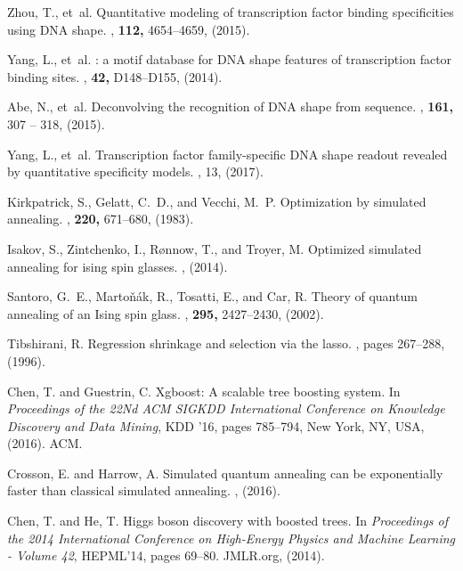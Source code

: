 \documentclass[aps,pra,groupedaddress,nofootinbib,notitlepage,showpacs,floatfix,superscriptaddress]{revtex4-1}
\begin{document}
\begin{thebibliography}{10}
Zhou, T., et~al.
\newblock Quantitative modeling of transcription factor binding specificities
  using {DNA} shape.
, {\bf 112,}
  4654--4659, (2015).

Yang, L., et~al.
: a motif database for {DNA} shape features of
  transcription factor binding sites.
, {\bf 42,} D148--D155, (2014).

Abe, N., et~al.
\newblock Deconvolving the recognition of {DNA} shape from sequence.
, {\bf 161,} 307 -- 318, (2015).

Yang, L., et~al.
\newblock Transcription factor family-specific {DNA} shape readout revealed by
  quantitative specificity models.
, 13, (2017).

Kirkpatrick, S., Gelatt, C.~D., and Vecchi, M.~P.
\newblock Optimization by simulated annealing.
, {\bf 220,} 671--680, (1983).

Isakov, S., Zintchenko, I., R{\o}nnow, T., and Troyer, M.
\newblock Optimized simulated annealing for ising spin glasses.
, (2014).

Santoro, G.~E., Marto\v{n}\'{a}k, R., Tosatti, E., and Car, R.
\newblock Theory of quantum annealing of an {I}sing spin glass.
, {\bf 295,} 2427--2430, (2002).

Tibshirani, R.
\newblock Regression shrinkage and selection via the lasso.
, pages 267--288, (1996).

Chen, T. and Guestrin, C.
\newblock Xgboost: A scalable tree boosting system.
\newblock In {\em Proceedings of the 22Nd ACM SIGKDD International Conference
  on Knowledge Discovery and Data Mining}, KDD '16, pages 785--794, New York,
  NY, USA, (2016). ACM.

Crosson, E. and Harrow, A.
\newblock Simulated quantum annealing can be exponentially faster than
  classical simulated annealing.
, (2016).

Chen, T. and He, T.
\newblock Higgs boson discovery with boosted trees.
\newblock In {\em Proceedings of the 2014 International Conference on
  High-Energy Physics and Machine Learning - Volume 42}, HEPML'14, pages
  69--80. JMLR.org, (2014).


\end{thebibliography}
\end{document}
